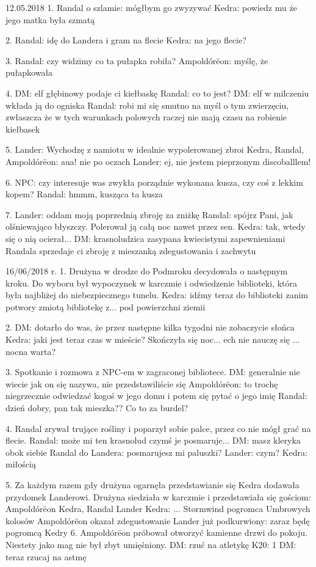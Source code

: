 \documentclass[10pt,twoside,twocolumn]{book}
\begin{document}
12.05.2018
1. Randal o szlamie: mógłbym go zwyzywać
Kedra: powiedz mu że jego matka była szmatą

2. Randal: idę do Landera i gram na flecie
Kedra: na jego flecie?

3. Randal: czy widzimy co ta pułapka robiła?
Ampoldórëon: myślę, że pułapkowała

4. DM: elf głębinowy podaje ci kiełbaskę
Randal: co to jest?
DM: elf w milczeniu wkłada ją do ogniska
Randal: robi mi się smutno na myśl o tym zwierzęciu, zwłaszcza że w tych warunkach polowych raczej nie mają czasu na robienie kiełbasek

5. Lander: Wychodzę z namiotu w idealnie wypolerowanej zbroi
Kedra, Randal, Ampoldórëon: aua! nie po oczach
Lander: ej, nie jestem pieprzonym discoballlem!

6. NPC: czy interesuje was zwykła porządnie wykonana kusza, czy coś z lekkim kopem?
Randal: hmmm, kusząca ta kusza

7. Lander: oddam moją poprzednią zbroję za zniżkę
Randal: spójrz Pani, jak olśniewająco błyszczy. Polerował ją całą noc nawet przez sen.
Kedra: tak, wtedy się o nią ocierał...
DM: krasnoludzica zasypana kwiecistymi zapewnieniami Randala sprzedaje ci zbroję z mieszanką zdegustowania i zachwytu

16/06/2018 r.
1. Drużyna w drodze do Podmroku decydowała o następnym kroku. Do wyboru był wypoczynek w karczmie i odwiedzenie biblioteki, która była najbliżej do niebezpiecznego tunelu.
Kedra: idźmy teraz do biblioteki zanim potwory zmiotą bibliotekę z... pod powierzchni ziemii

2. DM: dotarło do was, że przez następne kilka tygodni nie zobaczycie słońca
Kedra: jaki jest teraz czas w mieście? Skończyła się noc... ech nie nauczę się ... nocna warta?

3. Spotkanie i rozmowa z NPC-em w zagraconej bibliotece.
DM: generalnie nie wiecie jak on się nazywa, nie przedstawiliście się
Ampoldórëon: to trochę niegrzecznie odwiedzać kogoś w jego domu i potem się pytać o jego imię
Randal: dzień dobry, pan tak mieszka?? Co to za burdel?

4. Randal zrywał trujące rośliny i poparzył sobie palce, przez co nie mógł grać na flecie.
Randal: może mi ten krasnolud czymś je posmaruje...
DM: masz kleryka obok siebie
Randal do Landera: posmarujesz mi paluszki?
Lander: czym?
Kedra: miłością

5. Za każdym razem gdy drużyna ogarnęła przedstawianie się Kedra dodawała przydomek Landerowi. Drużyna siedziała w karczmie i przedstawiała się gościom:
Ampoldórëon
Kedra,
Randal
Lander
Kedra: ... Stormwind pogromca Umbrowych kolosów
Ampoldórëon okazał zdegustowanie
Lander już podkurwiony: zaraz będę pogromcą Kedry
6.  Ampoldórëon próbował otworzyć kamienne drzwi do pokoju. Niestety jako mag nie był zbyt umięśniony.
DM: rzuć na atletykę
K20: 1
DM: teraz rzucaj na astmę
\end{document}
